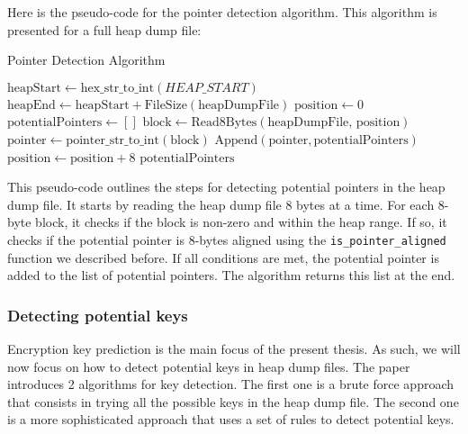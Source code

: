    Here is the pseudo-code for the pointer detection algorithm. This algorithm is presented for a full heap dump file:

    \begin{algorithm}
        \caption{Pointer Detection Algorithm}
        \begin{algorithmic}[1]
            \State $\text{heapStart} \gets \text{hex\_str\_to\_int}(HEAP\_START)$
            \State $\text{heapEnd} \gets \text{heapStart} + \text{FileSize}(\text{heapDumpFile})$
            \State $\text{position} \gets 0$
            \State $\text{potentialPointers} \gets []$
                \State $\text{block} \gets \text{Read8Bytes}(\text{heapDumpFile, position})$
                    \State $\text{pointer} \gets \text{pointer\_str\_to\_int}(\text{block})$
                            \State $\text{Append}(\text{pointer}, \text{potentialPointers})$
                        \EndIf
                    \EndIf
                \EndIf
                \State $\text{position} \gets \text{position} + 8$
            \EndWhile
            \State \Return $\text{potentialPointers}$
        \EndProcedure
        \end{algorithmic}
    \end{algorithm}

    This pseudo-code outlines the steps for detecting potential pointers in the heap dump file. It starts by reading the heap dump file 8 bytes at a time. For each 8-byte block, it checks if the block is non-zero and within the heap range. If so, it checks if the potential pointer is 8-bytes aligned using the \texttt{is\_pointer\_aligned} function we described before. If all conditions are met, the potential pointer is added to the list of potential pointers. The algorithm returns this list at the end.
    
    \subsubsection{Detecting potential keys}

    Encryption key prediction is the main focus of the present thesis. As such, we will now focus on how to detect potential keys in heap dump files. The paper  introduces 2 algorithms for key detection. The first one is a brute force approach that consists in trying all the possible keys in the heap dump file. The second one is a more sophisticated approach that uses a set of rules to detect potential keys.
    
